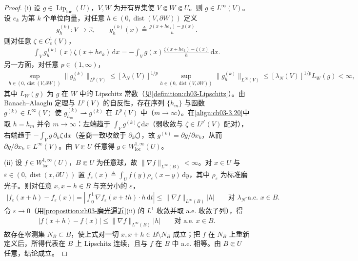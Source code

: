 \documentclass[../../main.tex]{subfiles}%
\begin{document}
\begin{proof}
(i) 设 $g\in\operatorname{Lip}_{\mathrm{loc}}(U)$，$V,W$ 为开有界集使 $V\Subset W\Subset U$。则 $g\in L^\infty(V)$。设 $e_k$ 为第 $k$ 个单位向量，对任意 $h\in(0,\operatorname{dist}(V,\partial W))$ 定义
\begin{align*}
g_h^{(k)}:V\to\mathbb{R},\qquad g_h^{(k)}(x)\triangleq\frac{g(x+he_k)-g(x)}{h}.
\end{align*}
则对任意 $\zeta\in C^1_c(V)$，
\begin{align}
\int_V g_h^{(k)}(x)\zeta(x+he_k)\,\mathrm{d}x
=-\int_V g(x)\frac{\zeta(x+he_k)-\zeta(x)}{h}\,\mathrm{d}x.\label{align:ch03-3.20}
\end{align}
另一方面，对任意 $p\in(1,\infty)$，
\begin{align*}
\sup_{h\in(0,\operatorname{dist}(V,\partial W))}\|g_h^{(k)}\|_{L^p(V)}
\leqslant[\lambda_N(V)]^{1/p}\sup_{h\in(0,\operatorname{dist}(V,\partial W))}\|g_h^{(k)}\|_{L^\infty(V)}
\leqslant[\lambda_N(V)]^{1/p}L_W(g)<\infty,
\end{align*}
其中 $L_W(g)$ 为 $g$ 在 $W$ 中的 Lipschitz 常数（见\cref{definition:ch03-Lipschitz}）。由 Banach--Alaoglu 定理与 $L^p(V)$ 的自反性，存在序列 $\{h_m\}$ 与函数 $g^{(k)}\in L^\infty(V)$ 使 $g_{h_m}^{(k)}\rightharpoonup g^{(k)}$ 在 $L^p(V)$ 中（$m\to\infty$）。在\eqref{align:ch03-3.20}中取 $h=h_m$ 并令 $m\to\infty$：左端趋于 $\int_Vg^{(k)}\zeta\,\mathrm{d}x$（弱收敛与 $\zeta\in L^{p'}(V)$ 配对），右端趋于 $-\int_Vg\,\partial_k\zeta\,\mathrm{d}x$（差商一致收敛于 $\partial_k\zeta$），故 $g^{(k)}=\partial g/\partial x_k$，从而 $\partial g/\partial x_k\in L^\infty(V)$。由 $V\Subset U$ 任意得 $g\in W^{1,\infty}_{\mathrm{loc}}(U)$。

(ii) 设 $f\in W^{1,\infty}_{\mathrm{loc}}(U)$，$B\Subset U$ 为任意球，故 $\|\nabla f\|_{L^\infty(B)}<\infty$。对 $x\in U$ 与 $\varepsilon\in(0,\operatorname{dist}(x,\partial U))$ 置 $f_\varepsilon(x)\triangleq\int_Uf(y)\rho_\varepsilon(x-y)\,\mathrm{d}y$，其中 $\rho_\varepsilon$ 为标准磨光子。则对任意 $x,x+h\in B$ 与充分小的 $\varepsilon$，
\begin{align*}
|f_\varepsilon(x+h)-f_\varepsilon(x)|=\left|\int_0^1\nabla f_\varepsilon(x+th)\cdot h\,\mathrm{d}t\right|\leqslant\|\nabla f\|_{L^\infty(B)}|h|
\qquad\text{对 }\lambda_N\text{-a.e. }x\in B.
\end{align*}
令 $\varepsilon\to0$（用\cref{proposition:ch03-磨光逼近}(ii) 的 $L^1$ 收敛并取 a.e. 收敛子列），得
\begin{align*}
|f(x+h)-f(x)|\leqslant\|\nabla f\|_{L^\infty(B)}|h|\qquad\text{对 a.e. }x\in B.
\end{align*}
故存在零测集 $N_B\subset B$，使上式对一切 $x,x+h\in B\setminus N_B$ 成立；把 $f$ 在 $N_B$ 上重新定义后，所得代表在 $B$ 上 Lipschitz 连续，且与 $f$ 在 $B$ 中 a.e. 相等。由 $B\Subset U$ 任意，结论成立。
\end{proof}
\end{document}
